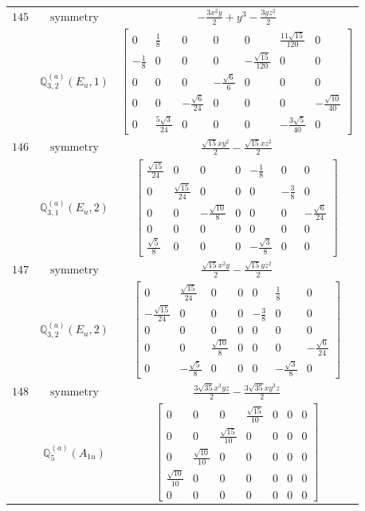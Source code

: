 \documentclass[fleqn,8pt,landscape]{jsarticle}
\begin{document}
\begin{longtable}{ccc}
$ 145 $ & $ \text{symmetry} $ & $ - \frac{3 x^{2} y}{2} + y^{3} - \frac{3 y z^{2}}{2} $ \\
$  $ & $ \mathbb{Q}_{3,2}^{(a)}(E_{u},1) $ & $ \begin{bmatrix} 0 & \frac{1}{8} & 0 & 0 & 0 & \frac{11 \sqrt{15}}{120} & 0 \\ - \frac{1}{8} & 0 & 0 & 0 & - \frac{\sqrt{15}}{120} & 0 & 0 \\ 0 & 0 & 0 & - \frac{\sqrt{6}}{6} & 0 & 0 & 0 \\ 0 & 0 & - \frac{\sqrt{6}}{24} & 0 & 0 & 0 & - \frac{\sqrt{10}}{40} \\ 0 & \frac{5 \sqrt{3}}{24} & 0 & 0 & 0 & - \frac{3 \sqrt{5}}{40} & 0 \end{bmatrix} $ \\ \hline
$ 146 $ & $ \text{symmetry} $ & $ \frac{\sqrt{15} x y^{2}}{2} - \frac{\sqrt{15} x z^{2}}{2} $ \\
$  $ & $ \mathbb{Q}_{3,1}^{(a)}(E_{u},2) $ & $ \begin{bmatrix} \frac{\sqrt{15}}{24} & 0 & 0 & 0 & - \frac{1}{8} & 0 & 0 \\ 0 & \frac{\sqrt{15}}{24} & 0 & 0 & 0 & - \frac{3}{8} & 0 \\ 0 & 0 & - \frac{\sqrt{10}}{8} & 0 & 0 & 0 & - \frac{\sqrt{6}}{24} \\ 0 & 0 & 0 & 0 & 0 & 0 & 0 \\ \frac{\sqrt{5}}{8} & 0 & 0 & 0 & - \frac{\sqrt{3}}{8} & 0 & 0 \end{bmatrix} $ \\ \hline
$ 147 $ & $ \text{symmetry} $ & $ \frac{\sqrt{15} x^{2} y}{2} - \frac{\sqrt{15} y z^{2}}{2} $ \\
$  $ & $ \mathbb{Q}_{3,2}^{(a)}(E_{u},2) $ & $ \begin{bmatrix} 0 & \frac{\sqrt{15}}{24} & 0 & 0 & 0 & \frac{1}{8} & 0 \\ - \frac{\sqrt{15}}{24} & 0 & 0 & 0 & - \frac{3}{8} & 0 & 0 \\ 0 & 0 & 0 & 0 & 0 & 0 & 0 \\ 0 & 0 & \frac{\sqrt{10}}{8} & 0 & 0 & 0 & - \frac{\sqrt{6}}{24} \\ 0 & - \frac{\sqrt{5}}{8} & 0 & 0 & 0 & - \frac{\sqrt{3}}{8} & 0 \end{bmatrix} $ \\ \hline
$ 148 $ & $ \text{symmetry} $ & $ \frac{3 \sqrt{35} x^{3} y z}{2} - \frac{3 \sqrt{35} x y^{3} z}{2} $ \\
$  $ & $ \mathbb{Q}_{5}^{(a)}(A_{1u}) $ & $ \begin{bmatrix} 0 & 0 & 0 & \frac{\sqrt{15}}{10} & 0 & 0 & 0 \\ 0 & 0 & \frac{\sqrt{15}}{10} & 0 & 0 & 0 & 0 \\ 0 & \frac{\sqrt{10}}{10} & 0 & 0 & 0 & 0 & 0 \\ \frac{\sqrt{10}}{10} & 0 & 0 & 0 & 0 & 0 & 0 \\ 0 & 0 & 0 & 0 & 0 & 0 & 0 \end{bmatrix} $ \\ \hline

\end{longtable}
\end{document}
